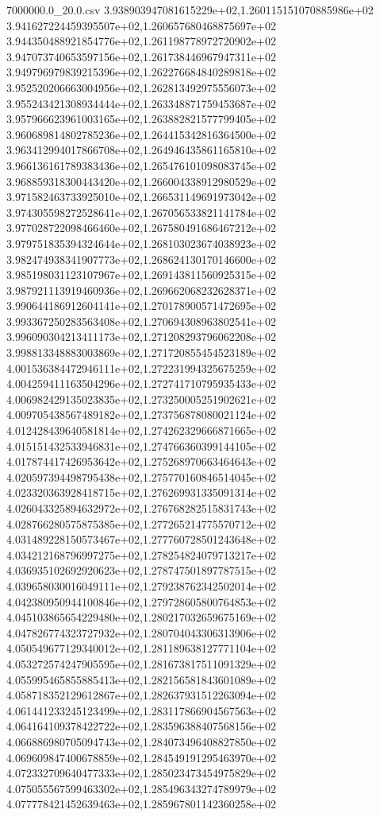 \begin{filecontents*}{7000000.0_20.0.csv}
3.938903947081615229e+02,1.260115151070885986e+02
3.941627224459395507e+02,1.260657680468875697e+02
3.944350488921854776e+02,1.261198778972720902e+02
3.947073740653597156e+02,1.261738446967947311e+02
3.949796979839215396e+02,1.262276684840289818e+02
3.952520206663004956e+02,1.262813492975556073e+02
3.955243421308934444e+02,1.263348871759453687e+02
3.957966623961003165e+02,1.263882821577799405e+02
3.960689814802785236e+02,1.264415342816364500e+02
3.963412994017866708e+02,1.264946435861165810e+02
3.966136161789383436e+02,1.265476101098083745e+02
3.968859318300443420e+02,1.266004338912980529e+02
3.971582463733925010e+02,1.266531149691973042e+02
3.974305598272528641e+02,1.267056533821141784e+02
3.977028722098466460e+02,1.267580491686467212e+02
3.979751835394324644e+02,1.268103023674038923e+02
3.982474938341907773e+02,1.268624130170146600e+02
3.985198031123107967e+02,1.269143811560925315e+02
3.987921113919460936e+02,1.269662068232628371e+02
3.990644186912604141e+02,1.270178900571472695e+02
3.993367250283563408e+02,1.270694308963802541e+02
3.996090304213411173e+02,1.271208293796062208e+02
3.998813348883003869e+02,1.271720855454523189e+02
4.001536384472946111e+02,1.272231994325675259e+02
4.004259411163504296e+02,1.272741710795935433e+02
4.006982429135023835e+02,1.273250005251902621e+02
4.009705438567489182e+02,1.273756878080021124e+02
4.012428439640581814e+02,1.274262329666871665e+02
4.015151432533946831e+02,1.274766360399144105e+02
4.017874417426953642e+02,1.275268970663464643e+02
4.020597394498795438e+02,1.275770160846514045e+02
4.023320363928418715e+02,1.276269931335091314e+02
4.026043325894632972e+02,1.276768282515831743e+02
4.028766280575875385e+02,1.277265214775570712e+02
4.031489228150573467e+02,1.277760728501243648e+02
4.034212168796997275e+02,1.278254824079713217e+02
4.036935102692920623e+02,1.278747501897787515e+02
4.039658030016049111e+02,1.279238762342502014e+02
4.042380950944100846e+02,1.279728605800764853e+02
4.045103865654229480e+02,1.280217032659675169e+02
4.047826774323727932e+02,1.280704043306313906e+02
4.050549677129340012e+02,1.281189638127771104e+02
4.053272574247905595e+02,1.281673817511091329e+02
4.055995465855885413e+02,1.282156581843601089e+02
4.058718352129612867e+02,1.282637931512263094e+02
4.061441233245123499e+02,1.283117866904567563e+02
4.064164109378422722e+02,1.283596388407568156e+02
4.066886980705094743e+02,1.284073496408827850e+02
4.069609847400678859e+02,1.284549191295463970e+02
4.072332709640477333e+02,1.285023473454975829e+02
4.075055567599463302e+02,1.285496343274789979e+02
4.077778421452639463e+02,1.285967801142360258e+02

\end{filecontents*}

